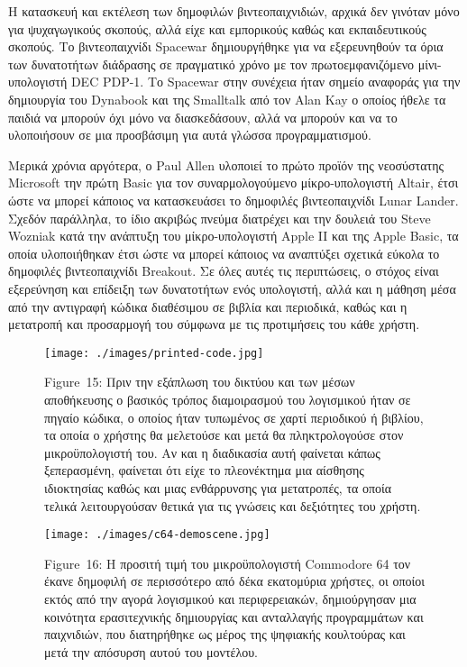 \documentclass[
]{article}
\begin{document}
Η κατασκευή και εκτέλεση των δημοφιλών βιντεοπαιχνιδιών, αρχικά δεν
γινόταν μόνο για ψυχαγωγικούς σκοπούς, αλλά είχε και εμπορικούς καθώς
και εκπαιδευτικούς σκοπούς. Το βιντεοπαιχνίδι Spacewar δημιουργήθηκε για
να εξερευνηθούν τα όρια των δυνατοτήτων διάδρασης σε πραγματικό χρόνο με
τον πρωτοεμφανιζόμενο μίνι-υπολογιστή DEC PDP-1. Το Spacewar στην
συνέχεια ήταν σημείο αναφοράς για την δημιουργία του Dynabook και της
Smalltalk από τον Alan Kay ο οποίος ήθελε τα παιδιά να μπορούν όχι μόνο
να διασκεδάσουν, αλλά να μπορούν και να το υλοποιήσουν σε μια προσβάσιμη
για αυτά γλώσσα προγραμματισμού.

Μερικά χρόνια αργότερα, ο Paul Allen υλοποιεί το πρώτο προϊόν της
νεοσύστατης Microsoft την πρώτη Basic για τον συναρμολογούμενο
μίκρο-υπολογιστή Altair, έτσι ώστε να μπορεί κάποιος να κατασκευάσει το
δημοφιλές βιντεοπαιχνίδι Lunar Lander. Σχεδόν παράλληλα, το ίδιο ακριβώς
πνεύμα διατρέχει και την δουλειά του Steve Wozniak κατά την ανάπτυξη του
μίκρο-υπολογιστή Apple II και της Apple Basic, τα οποία υλοποιήθηκαν
έτσι ώστε να μπορεί κάποιος να αναπτύξει σχετικά εύκολα το δημοφιλές
βιντεοπαιχνίδι Breakout. Σε όλες αυτές τις περιπτώσεις, ο στόχος είναι
εξερεύνηση και επίδειξη των δυνατοτήτων ενός υπολογιστή, αλλά και η
μάθηση μέσα από την αντιγραφή κώδικα διαθέσιμου σε βιβλία και περιοδικά,
καθώς και η μετατροπή και προσαρμογή του σύμφωνα με τις προτιμήσεις του
κάθε χρήστη.

\leavevmode{}%
\begin{figure}
\hypertarget{fig:printed-code}{%
\centering
\texttt{[image: ./images/printed-code.jpg]}
\caption{Figure~15: Πριν την εξάπλωση του δικτύου και των μέσων
αποθήκευσης ο βασικός τρόπος διαμοιρασμού του λογισμικού ήταν σε πηγαίο
κώδικα, ο οποίος ήταν τυπωμένος σε χαρτί περιοδικού ή βιβλίου, τα οποία
ο χρήστης θα μελετούσε και μετά θα πληκτρολογούσε στον μικροϋπολογιστή
του. Αν και η διαδικασία αυτή φαίνεται κάπως ξεπερασμένη, φαίνεται ότι
είχε το πλεονέκτημα μια αίσθησης ιδιοκτησίας καθώς και μιας ενθάρρυνσης
για μετατροπές, τα οποία τελικά λειτουργούσαν θετικά για τις γνώσεις και
δεξιότητες του χρήστη.}\label{fig:printed-code}
}
\end{figure}

\leavevmode{}%
\begin{figure}
\hypertarget{fig:c64-demoscene}{%
\centering
\texttt{[image: ./images/c64-demoscene.jpg]}
\caption{Figure~16: Η προσιτή τιμή του μικροϋπολογιστή Commodore 64 τον
έκανε δημοφιλή σε περισσότερο από δέκα εκατομύρια χρήστες, οι οποίοι
εκτός από την αγορά λογισμικού και περιφερειακών, δημιούργησαν μια
κοινότητα ερασιτεχνικής δημιουργίας και ανταλλαγής προγραμμάτων και
παιχνιδιών, που διατηρήθηκε ως μέρος της ψηφιακής κουλτούρας και μετά
την απόσυρση αυτού του μοντέλου.}\label{fig:c64-demoscene}
}
\end{figure}
\end{document}
